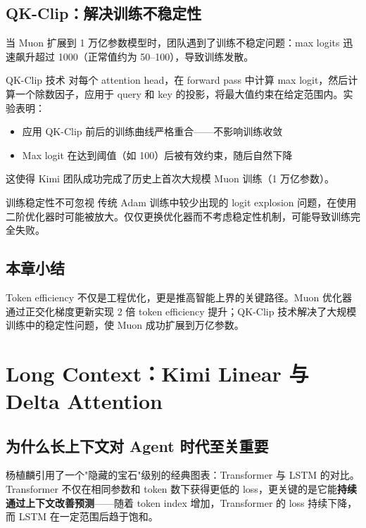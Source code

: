 \documentclass[a4paper]{article}
\begin{document}
\subsection{QK-Clip：解决训练不稳定性}

当 Muon 扩展到 1 万亿参数模型时，团队遇到了训练不稳定问题：max logits 迅速飙升超过 1000（正常值约为 50--100），导致训练发散。

\begin{importantbox}{QK-Clip 技术}
对每个 attention head，在 forward pass 中计算 max logit，然后计算一个除数因子，应用于 query 和 key 的投影，将最大值约束在给定范围内。实验表明：
\begin{itemize}
    \item 应用 QK-Clip 前后的训练曲线严格重合——不影响训练收敛
    \item Max logit 在达到阈值（如 100）后被有效约束，随后自然下降
\end{itemize}
这使得 Kimi 团队成功完成了历史上首次大规模 Muon 训练（1 万亿参数）。
\end{importantbox}

\begin{warningbox}{训练稳定性不可忽视}
传统 Adam 训练中较少出现的 logit explosion 问题，在使用二阶优化器时可能被放大。仅仅更换优化器而不考虑稳定性机制，可能导致训练完全失败。
\end{warningbox}

\subsection{本章小结}

Token efficiency 不仅是工程优化，更是推高智能上界的关键路径。Muon 优化器通过正交化梯度更新实现 2 倍 token efficiency 提升；QK-Clip 技术解决了大规模训练中的稳定性问题，使 Muon 成功扩展到万亿参数。


\section{Long Context：Kimi Linear 与 Delta Attention}

\subsection{为什么长上下文对 Agent 时代至关重要}

杨植麟引用了一个"隐藏的宝石"级别的经典图表：Transformer 与 LSTM 的对比。Transformer 不仅在相同参数和 token 数下获得更低的 loss，更关键的是它能\textbf{持续通过上下文改善预测}——随着 token index 增加，Transformer 的 loss 持续下降，而 LSTM 在一定范围后趋于饱和。
\end{document}
